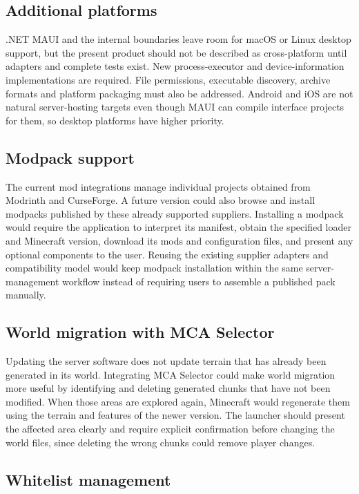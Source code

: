 \subsection{Additional platforms}

.NET MAUI and the internal boundaries leave room for macOS or Linux desktop support, but the present product should not be described as cross-platform until adapters and complete tests exist. New process-executor and device-information implementations are required. File permissions, executable discovery, archive formats and platform packaging must also be addressed. Android and iOS are not natural server-hosting targets even though MAUI can compile interface projects for them, so desktop platforms have higher priority.

\subsection{Modpack support}

The current mod integrations manage individual projects obtained from Modrinth and CurseForge. A future version could also browse and install modpacks published by these already supported suppliers. Installing a modpack would require the application to interpret its manifest, obtain the specified loader and Minecraft version, download its mods and configuration files, and present any optional components to the user. Reusing the existing supplier adapters and compatibility model would keep modpack installation within the same server-management workflow instead of requiring users to assemble a published pack manually.

\subsection{World migration with MCA Selector}

Updating the server software does not update terrain that has already been generated in its world. Integrating MCA Selector could make world migration more useful by identifying and deleting generated chunks that have not been modified. When those areas are explored again, Minecraft would regenerate them using the terrain and features of the newer version. The launcher should present the affected area clearly and require explicit confirmation before changing the world files, since deleting the wrong chunks could remove player changes.

\subsection{Whitelist management}

